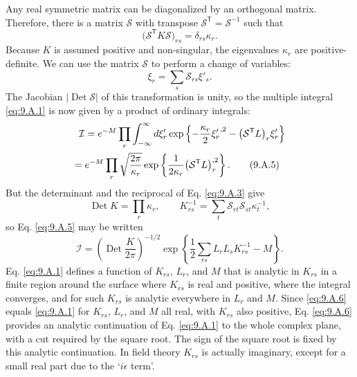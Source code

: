 Any real symmetric matrix can be diagonalized by an orthogonal matrix.
Therefore, there is a matrix $\mathcal{S}$ with transpose
$\mathcal{S}^{\mathsf T}=\mathcal{S}^{-1}$ such that
\begin{equation}
  \bigl(\mathcal{S}^{\mathsf T}K\mathcal{S}\bigr)_{rs}
  =\delta_{rs}\kappa_r.
  \tag{9.A.3}\label{eq:9.A.3}
\end{equation}
Because $K$ is assumed positive and non-singular, the eigenvalues $\kappa_r$
are positive-definite. We can use the matrix $\mathcal{S}$ to perform a
change of variables:
\begin{equation}
  \xi_r=\sum_s\mathcal{S}_{rs}\xi'_s.
  \tag{9.A.4}\label{eq:9.A.4}
\end{equation}
The Jacobian $|\operatorname{Det}\mathcal{S}|$ of this transformation is
unity, so the multiple integral \eqref{eq:9.A.1} is now given by a product of
ordinary integrals:
\begin{align}
  \mathcal{I}
  &={}e^{-M}\prod_r\int_{-\infty}^{\infty}d\xi'_r
  \exp\left\{-\frac{\kappa_r}{2}{\xi'_r}^{,2}
  -\bigl(\mathcal{S}^{\mathsf T}L\bigr)_r\xi'_r\right\}
  \notag\\
  ={}&e^{-M}\prod_r\sqrt{\frac{2\pi}{\kappa_r}}
  \exp\left\{\frac{1}{2\kappa_r}
  \bigl(\mathcal{S}^{\mathsf T}L\bigr)_r^{,2}\right\}.
  \tag{9.A.5}\label{eq:9.A.5}
\end{align}
But the determinant and the reciprocal of Eq. \eqref{eq:9.A.3} give
\[
  \operatorname{Det}K=\prod_r\kappa_r,
  \qquad
  K^{-1}_{rs}=\sum_t\mathcal{S}_{rt}\mathcal{S}_{st}\kappa_t^{-1},
\]
so Eq. \eqref{eq:9.A.5} may be written
\begin{equation}
  \mathcal{I}=\left(\operatorname{Det}\frac{K}{2\pi}\right)^{-1/2}
  \exp\left\{\frac{1}{2}\sum_{rs}L_rL_sK^{-1}_{rs}-M\right\}.
  \tag{9.A.6}\label{eq:9.A.6}
\end{equation}
Eq. \eqref{eq:9.A.1} defines a function of $K_{rs}$, $L_r$, and $M$ that is analytic
in $K_{rs}$ in a finite region around the surface where $K_{rs}$ is real and
positive, where the integral converges, and for such $K_{rs}$ is analytic
everywhere in $L_r$ and $M$. Since \eqref{eq:9.A.6} equals \eqref{eq:9.A.1} for $K_{rs}$,
$L_r$, and $M$ all real, with $K_{rs}$ also positive, Eq. \eqref{eq:9.A.6} provides
an analytic continuation of Eq. \eqref{eq:9.A.1} to the whole complex plane, with a
cut required by the square root. The sign of the square root is fixed by this
analytic continuation. In field theory $K_{rs}$ is actually imaginary,
except for a small real part due to the `$i\epsilon$ term'.

